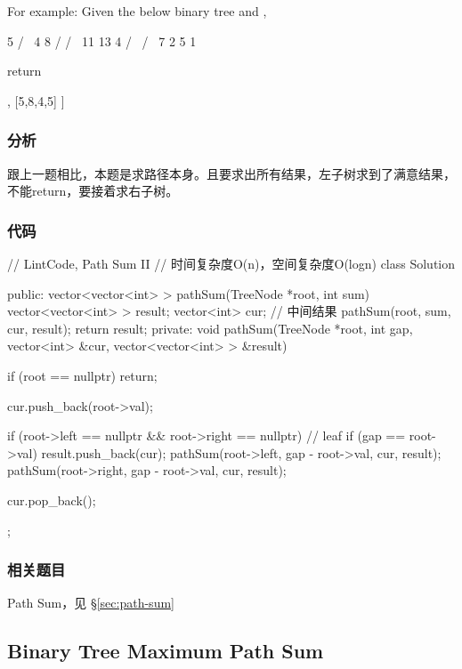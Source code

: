 For example:
Given the below binary tree and ,
\begin{Code}
          5
         / \
        4   8
       /   / \
      11  13  4
     /  \    / \
    7    2  5   1
\end{Code}
return
\begin{Code}
[
   [5,4,11,2],
   [5,8,4,5]
]
\end{Code}


\subsubsection{分析}
跟上一题相比，本题是求路径本身。且要求出所有结果，左子树求到了满意结果，不能return，要接着求右子树。

\subsubsection{代码}

\begin{Code}
// LintCode, Path Sum II
// 时间复杂度O(n)，空间复杂度O(logn)
class Solution {
public:
    vector<vector<int> > pathSum(TreeNode *root, int sum) {
        vector<vector<int> > result;
        vector<int> cur; // 中间结果
        pathSum(root, sum, cur, result);
        return result;
    }
private:
    void pathSum(TreeNode *root, int gap, vector<int> &cur,
            vector<vector<int> > &result) {
        if (root == nullptr) return;

        cur.push_back(root->val);

        if (root->left == nullptr && root->right == nullptr) { // leaf
            if (gap == root->val)
                result.push_back(cur);
        }
        pathSum(root->left, gap - root->val, cur, result);
        pathSum(root->right, gap - root->val, cur, result);

        cur.pop_back();
    }
};
\end{Code}


\subsubsection{相关题目}
\begindot
\item Path Sum，见 \S \ref{sec:path-sum}
\myenddot


\subsection{Binary Tree Maximum Path Sum}
\label{sec:binary-tree-maximum-path-sum}


